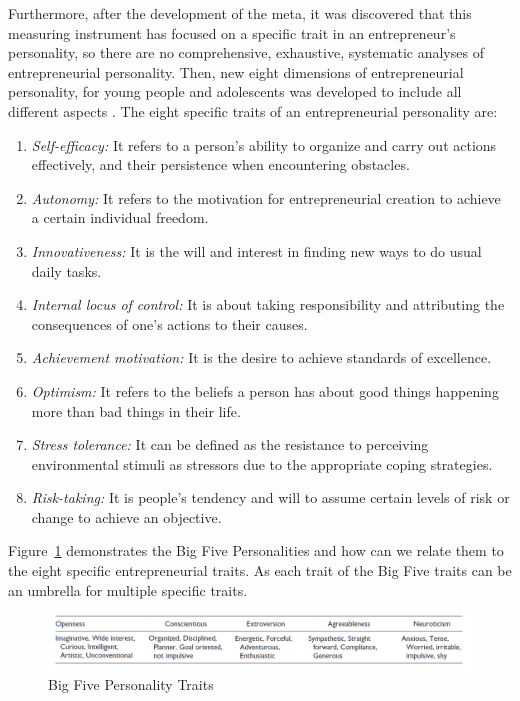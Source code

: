 Furthermore, after the development of the \ac{meta}, it was discovered that this measuring instrument has focused on a specific trait in an entrepreneur's personality, so there are no comprehensive, exhaustive, systematic analyses of entrepreneurial personality. Then, new eight dimensions of entrepreneurial personality, for young people and adolescents was developed to include all different aspects \cite{suarez2014screening}. The eight specific traits of an entrepreneurial personality are: 
\begin{enumerate}
\item \textit{Self-efficacy:} 
It refers to a person's ability to organize and carry out actions effectively, and their persistence when encountering obstacles.
\item \textit{Autonomy:}
It refers to the motivation for entrepreneurial creation to achieve a certain individual freedom.
\item \textit{Innovativeness:}
It is the will and interest in finding new ways to do usual daily tasks.
\item \textit{Internal locus of control:}
It is about taking responsibility and attributing the consequences of one's actions to their causes.
\item \textit{Achievement motivation:}
It is the desire to achieve standards of excellence.
\item \textit{Optimism:}
It refers to the beliefs a person has about good things happening more than bad things in their life.
\item \textit{Stress tolerance:}
It can be defined as the resistance to perceiving environmental stimuli as stressors due to the appropriate coping strategies.
\item \textit{Risk-taking:}
It is people's tendency and will to assume certain levels of risk or change to achieve an objective.
\end{enumerate}

Figure~\ref{tab: BigFiveTraits} demonstrates the Big Five Personalities and how can we relate them to the eight specific entrepreneurial traits. As each trait of the Big Five traits can be an umbrella for multiple specific traits. 

\begin{figure}[H]
\centering
\includegraphics[width=17cm]{Figure1}
\caption{Big Five Personality Traits\cite{suarez2014screening}}
\label{tab: BigFiveTraits}
\end{figure}


